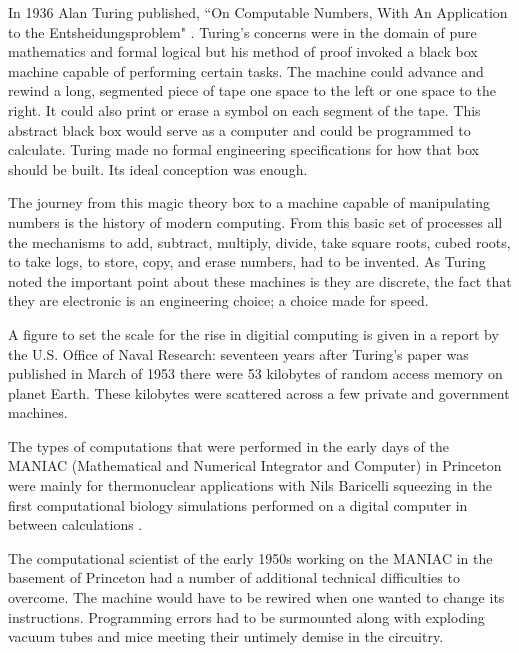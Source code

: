 In 1936 Alan Turing published, ``On Computable Numbers, 
With An Application to the Entsheidungsproblem"
\cite{turing36a}. Turing's concerns were in the domain of pure mathematics and
formal logical but his method of proof invoked a black box machine capable of performing
certain tasks. The machine could advance and rewind a long,
segmented piece of tape one space to the left or one space to the right. 
It could also print or erase a symbol on each segment of the tape.
This abstract black box would serve as a computer and could be programmed 
to calculate. Turing made no formal engineering
specifications for how that box should be built. 
Its ideal conception was enough.

The journey from this magic theory box to a machine capable of manipulating
numbers is the history of modern computing. From this basic set of processes
all the mechanisms to add, subtract, multiply, divide, take square roots, cubed roots, to take logs,
to store, copy, and erase numbers, had to be invented. As Turing noted the important point about
these machines is they are discrete, the fact that they are electronic
is an engineering choice; a choice made for speed.

A figure to set the scale for the rise in digitial computing is given in a report
by the U.S. Office of Naval Research: seventeen years after Turing's paper 
was published in March of 1953 there were 53 kilobytes of 
random access memory on planet Earth.\cite{usonr53}
These kilobytes were scattered across a few private and government machines. 

The types of computations that were performed in the early days of the MANIAC 
(Mathematical and Numerical Integrator and Computer) in Princeton
were mainly for thermonuclear applications with Nils Baricelli 
squeezing in the first computational biology simulations 
performed on a digital computer in between calculations \cite{dyson12, barricelli54, barricelli62}.

The computational scientist of the early 1950s working
on the MANIAC in the basement of Princeton had a number of additional 
technical difficulties to overcome. The machine would have to be rewired when one wanted
to change its instructions. Programming errors had to be surmounted along with exploding
vacuum tubes and mice meeting their untimely demise in the circuitry.

